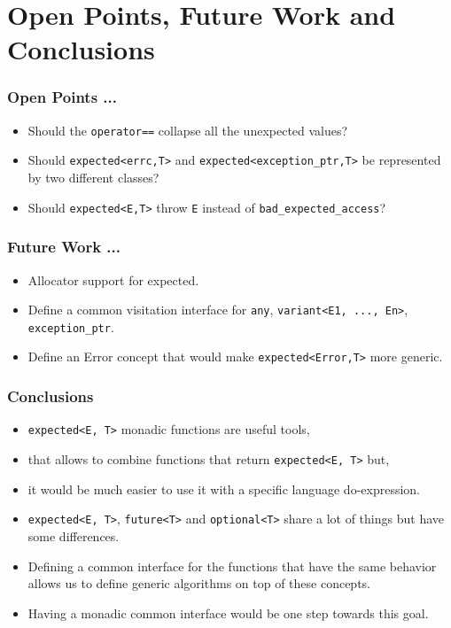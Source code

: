 \documentclass[xcolor=dvipsnames]{beamer}
\newcommand{\cpp}[1]{\lstinline{#1}}
\begin{document}
\section{Open Points, Future Work and Conclusions}

\begin{frame}
\frametitle{Open Points ...}

\begin{itemize}
  \item Should the \cpp{operator==} collapse all the unexpected values?
  \item Should \cpp{expected<errc,T>} and \cpp{expected<exception_ptr,T>} be represented by two different classes?
  \item Should \cpp{expected<E,T>} throw \cpp{E} instead of \cpp{bad_expected_access}?
\end{itemize}

\end{frame}

\begin{frame}
\frametitle{Future Work ...}

\begin{itemize}
  \item Allocator support for expected.
  \item Define a common visitation interface for \cpp{any}, \cpp{variant<E1, ..., En>}, \cpp{exception_ptr}.
  \item Define an Error concept that would make \cpp{expected<Error,T>} more generic.
\end{itemize}

\end{frame}

\begin{frame}
\frametitle{Conclusions}
\begin{itemize}
  \item \cpp{expected<E, T>} monadic functions are useful tools, 
  \item that allows to combine functions that return \cpp{expected<E, T>} but,
  \item it would be much easier to use it with a specific language do-expression.
\end{itemize}

\begin{itemize}
  \item \cpp{expected<E, T>}, \cpp{future<T>} and \cpp{optional<T>} share a lot of things but have some differences.
  \item Defining a common interface for the functions that have the same behavior allows us to define generic algorithms on top of these concepts.
  \item Having a monadic common interface would be one step towards this goal.
\end{itemize}

\end{frame}
\end{document}
